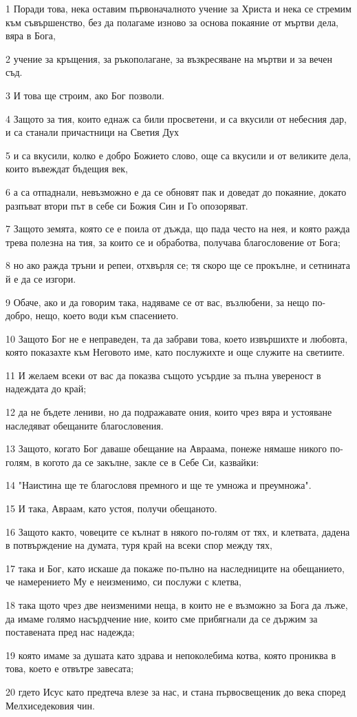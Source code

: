 \par 1 Поради това, нека оставим първоначалното учение за Христа и нека се стремим към съвършенство, без да полагаме изново за основа покаяние от мъртви дела, вяра в Бога,
\par 2 учение за кръщения, за ръкополагане, за възкресяване на мъртви и за вечен съд.
\par 3 И това ще строим, ако Бог позволи.
\par 4 Защото за тия, които еднаж са били просветени, и са вкусили от небесния дар, и са станали причастници на Светия Дух
\par 5 и са вкусили, колко е добро Божието слово, още са вкусили и от великите дела, които въвеждат бъдещия век,
\par 6 а са отпаднали, невъзможно е да се обновят пак и доведат до покаяние, докато разпъват втори път в себе си Божия Син и Го опозоряват.
\par 7 Защото земята, която се е поила от дъжда, що пада често на нея, и която ражда трева полезна на тия, за които се и обработва, получава благословение от Бога;
\par 8 но ако ражда тръни и репеи, отхвърля се; тя скоро ще се прокълне, и сетнината й е да се изгори.
\par 9 Обаче, ако и да говорим така, надяваме се от вас, възлюбени, за нещо по-добро, нещо, което води към спасението.
\par 10 Защото Бог не е неправеден, та да забрави това, което извършихте и любовта, която показахте към Неговото име, като послужихте и още служите на светиите.
\par 11 И желаем всеки от вас да показва същото усърдие за пълна увереност в надеждата до край;
\par 12 да не бъдете лениви, но да подражавате ония, които чрез вяра и устояване наследяват обещаните благословения.
\par 13 Защото, когато Бог даваше обещание на Авраама, понеже нямаше никого по-голям, в когото да се закълне, закле се в Себе Си, казвайки:
\par 14 "Наистина ще те благословя премного и ще те умножа и преумножа".
\par 15 И така, Авраам, като устоя, получи обещаното.
\par 16 Защото както, човеците се кълнат в някого по-голям от тях, и клетвата, дадена в потвърждение на думата, туря край на всеки спор между тях,
\par 17 така и Бог, като искаше да покаже по-пълно на наследниците на обещанието, че намерението Му е неизменимо, си послужи с клетва,
\par 18 така щото чрез две неизменими неща, в които не е възможно за Бога да лъже, да имаме голямо насърдчение ние, които сме прибягнали да се държим за поставената пред нас надежда;
\par 19 която имаме за душата като здрава и непоколебима котва, която прониква в това, което е отвътре завесата;
\par 20 гдето Исус като предтеча влезе за нас, и стана първосвещеник до века според Мелхиседековия чин.

